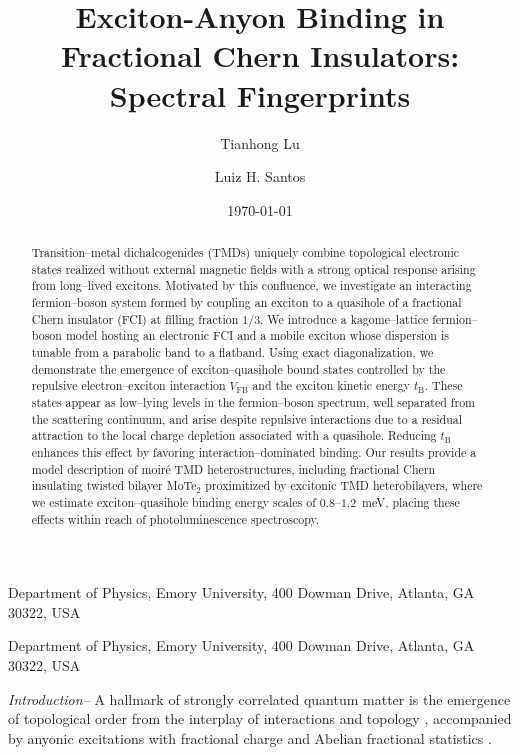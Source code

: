 \documentclass[aps,prl,twocolumn,amsmath,amssymb,nofootinbib,superscriptaddress,floatfix]{revtex4-1}
\begin{document}
 \title{Exciton-Anyon Binding in Fractional Chern Insulators: Spectral Fingerprints
}


\author{Tianhong Lu}
\affiliation
{
Department  of  Physics,  Emory  University,  400 Dowman Drive, Atlanta,  GA  30322,  USA
}
\author{Luiz H. Santos}
\affiliation
{
Department  of  Physics,  Emory  University,  400 Dowman Drive, Atlanta,  GA  30322,  USA
}



\begin{abstract}
Transition--metal dichalcogenides (TMDs) uniquely combine topological electronic states realized without external magnetic fields with a strong optical response arising from long--lived excitons. Motivated by this confluence, we investigate an interacting fermion--boson system formed by coupling an exciton to a quasihole of a fractional Chern insulator (FCI) at filling fraction \(1/3\). We introduce a kagome--lattice fermion--boson model hosting an electronic FCI and a mobile exciton whose dispersion is tunable from a parabolic band to a flatband. Using exact diagonalization, we demonstrate the emergence of exciton--quasihole bound states controlled by the repulsive electron--exciton interaction \(V_{\mathrm{FB}}\) and the exciton kinetic energy \(t_{\mathrm{B}}\). These states appear as low--lying levels in the fermion--boson spectrum, well separated from the scattering continuum, and arise despite repulsive interactions due to a residual attraction to the local charge depletion associated with a quasihole. Reducing \(t_{\mathrm{B}}\) enhances this effect by favoring interaction--dominated binding. Our results provide a model description of moir\'e TMD heterostructures, including fractional Chern insulating twisted bilayer MoTe$_2$ proximitized by excitonic TMD heterobilayers, where we estimate exciton--quasihole binding energy scales of {\(0.8\)--\(1.2\)~meV}, placing these effects within reach of photoluminescence spectroscopy.
\end{abstract}
\date{\today}

\maketitle



\noindent
\textit{Introduction--}
A hallmark of strongly correlated quantum matter is the emergence of topological order from the interplay of interactions and topology \cite{wen2004quantum}, accompanied by anyonic excitations with fractional charge \cite{laughlin1983anomalous} and Abelian fractional statistics \cite{halperin1984statistics,arovas1984fractional}.
\end{document}
